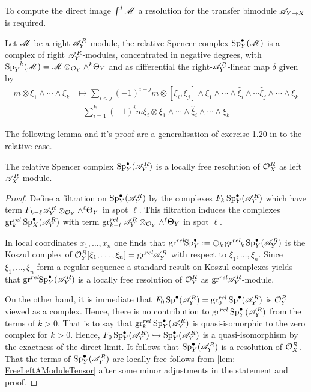     To compute the direct image $\int^j \mathscr{M}$ a resolution for the transfer bimodule $\mathscr{A}_{Y\to X}$ is required.
    \begin{definition}
        Let $\mathscr{M}$ be a right $\mathscr{A}_Y^R$-module, the relative Spencer complex $\operatorname{Sp}_Y^\bullet(\mathscr{M})$ is a complex of right $\mathscr{A}_Y^R$-modules, concentrated in negative degrees, with $\operatorname{Sp}_Y^{-k}(\mathscr{M}) = \mathscr{M} \otimes_{\mathcal{O}_Y} \wedge^{k}\Theta_Y$ and as differential the right-$\mathscr{A}_Y^R$-linear map $\delta$ given by
        \begin{align*}
            m\otimes \xi_1 \wedge \cdots \wedge \xi_k &\mapsto \sum_{i<j}(-1)^{i+j} m \otimes [\xi_i,\xi_j]\wedge \xi_1 \wedge \cdots \wedge \widehat{\xi}_i \wedge\cdots \widehat{\xi}_j \wedge \cdots \wedge \xi_k\\
            &- \sum_{i=1}^k (-1)^{i} m\xi_i \otimes \xi_1 \wedge \cdots \wedge \widehat{\xi}_i\wedge \cdots \wedge \xi_k
        \end{align*}
    \end{definition}
    The following lemma and it's proof are a generalisation of exercise 1.20 in \cite{sabbah2011introduction} to the relative case.
    \begin{lemma}\label{lem: RelativeSpencerResolvesOXR}
      The relative Spencer complex $\operatorname{Sp}_Y^\bullet(\mathscr{A}_Y^R)$ is a locally free resolution of $\mathcal{O}_X^R$ as left $\mathscr{A}_X^R$-module.
    \end{lemma}
    \begin{proof}
      Define a filtration on $\operatorname{Sp}_Y^\bullet(\mathscr{A}_Y^R)$ by the complexes $F_k\operatorname{Sp}_Y^\bullet(\mathscr{A}_Y^R)$ which have term $F_{k-\ell}\mathscr{A}_Y^R\otimes_{\mathcal{O}_Y}\wedge^\ell \Theta_Y$ in spot $\ell$.
      This filtration induces the complexes $\operatorname{gr}_k^{rel} \operatorname{Sp}_X^\bullet(\mathscr{A}_Y^R)$ with term  $\operatorname{gr}_{k-\ell}^{rel}\mathscr{A}_Y^R\otimes_{\mathcal{O}_Y}\wedge^\ell \Theta_Y$ in spot $\ell$.

      In local coordinates $x_1,\ldots, x_n$ one finds that $\operatorname{gr}^{rel}\mkern-5mu\operatorname{Sp}_Y^\bullet := \oplus_k \operatorname{gr}^{rel}\mkern-5mu_k \operatorname{Sp}_Y^\bullet(\mathscr{A}_Y^R)$ is the Koszul complex of $\mathcal{O}_Y^R[\xi_1,\ldots,\xi_n] = \operatorname{gr}^{rel}\mkern-5mu \mathscr{A}_Y^R$ with respect to  $\xi_1,\ldots, \xi_n$.
      Since $\xi_1,\ldots,\xi_n$ form a regular sequence a standard result on Koszul complexes yields that $\operatorname{gr}^{rel}\mkern-5mu\operatorname{Sp}_Y^\bullet(\mathscr{A}_Y^R)$ is a locally free resolution of $\mathcal{O}_Y^R$ as $\operatorname{gr}^{rel}\mkern-5mu \mathscr{A}_Y^R$-module.

      On the other hand, it is immediate that $F_0 \operatorname{Sp}^\bullet(\mathscr{A}_Y^R) = \operatorname{gr}_0^{rel}\operatorname{Sp}^\bullet(\mathscr{A}_Y^R)$ is  $\mathcal{O}_Y^R$ viewed as a complex. Hence, there is no contribution to $\operatorname{gr}^{rel}\operatorname{Sp}_Y^\bullet(\mathscr{A}_Y^R)$ from the terms of $k>0$.
      That is to say that $\operatorname{gr}_k^{rel}\operatorname{Sp}_Y^\bullet(\mathscr{A}_Y^R)$ is quasi-isomorphic to the zero complex for $k>0$.
      Hence, $F_0\operatorname{Sp}_Y^\bullet(\mathscr{A}_Y^R)\hookrightarrow \operatorname{Sp}_Y^\bullet(\mathscr{A}_Y^R)$ is a quasi-isomorphism by the exactness of the direct limit.
      It follows that  $\operatorname{Sp}_Y^\bullet(\mathscr{A}_Y^R)$ is a resolution of $\mathcal{O}_X^R$.
      That the terms of $\operatorname{Sp}_Y^\bullet(\mathscr{A}_Y^R)$ are locally free follows from \cref{lem: FreeLeftAModuleTensor} after some minor adjustments in the statement and proof.
    \end{proof}

